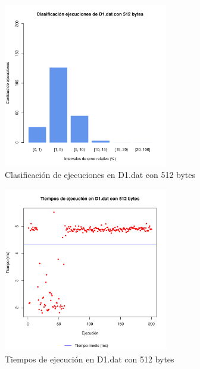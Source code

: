 \begin{figure}[h!]
    \centering
        \includegraphics[width=0.64\textwidth]{../figs/D1/plot_count_512.pdf}
        \caption{Clasificación de ejecuciones en D1.dat con 512 bytes}
    \label{figura:D1_count_512}
\end{figure}

\begin{figure}[h!]
    \centering
        \includegraphics[width=0.64\textwidth]{../figs/D1/plot_time_512.pdf}
        \caption{Tiempos de ejecución en D1.dat con 512 bytes}
    \label{figura:D1_time_512}
\end{figure}

\clearpage

